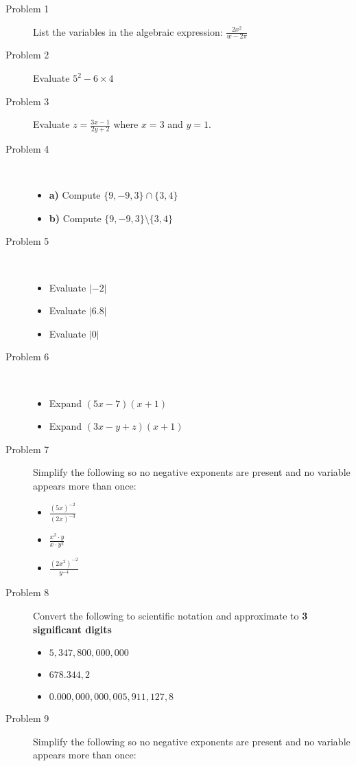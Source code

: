 \documentclass{article}
\begin{document}
\begin{description}
\item[Problem 1] List the variables in the algebraic expression: \(\frac{2x^2}{w - 2\pi}\)
\item[Problem 2] Evaluate \(5^2 - 6 \times 4\)
\item[Problem 3] Evaluate \(z = \frac{3x - 1}{2y + 2}\) where \(x = 3\) and \(y = 1\).
\item[Problem 4] ~~
	\begin{itemize}
	\item \textbf{a)} Compute \(\{9, -9, 3\} \cap \{3, 4\}\)
	\item \textbf{b)} Compute \(\{9, -9, 3\} \setminus \{3, 4\}\)
	\end{itemize}
\item[Problem 5] ~~
	\begin{itemize}
	\item Evaluate \(|-2|\)
	\item Evaluate \(|6.8|\)
	\item Evaluate \(|0|\)
	\end{itemize}
\item[Problem 6] ~~
	\begin{itemize}
	\item Expand \((5x - 7)(x + 1)\)
	\item Expand \((3x - y + z)(x + 1)\)
	\end{itemize}
\item[Problem 7] Simplify the following so no negative exponents are present and no variable appears more than once:
	\begin{itemize}
	\item \(\frac{(5x)^{-2}}{(2x)^{-3}}\)
	\item \(\frac{x^2 \cdot y}{x \cdot y^2}\)
	\item \(\frac{(2x^2)^{-2}}{y^{-4}}\)
	\end{itemize}
\item[Problem 8] Convert the following to scientific notation and approximate to {\bf 3 significant digits}
	\begin{itemize}
	\item \(5,\!347,\!800,\!000,\!000\)
	\item \(678.344,\!2\)
	\item \(0.000,\!000,\!000,\!005,\!911,\!127,\!8\)
	\end{itemize}
\item[Problem 9] Simplify the following so no negative exponents are present and no variable appears more than once:

\end{description}
\end{document}

